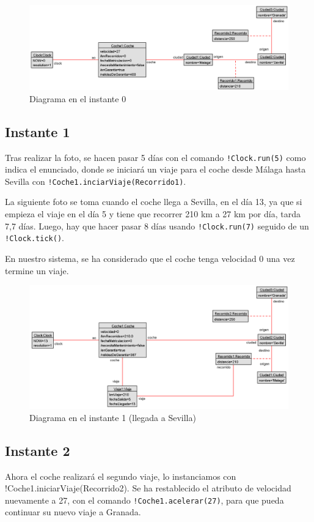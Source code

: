 \documentclass[12pt.a4paper]{article}
\begin{document}
\begin{figure}[H]
    \centering
    \includegraphics[width=\linewidth]{fotosInstantes/Instante0.png}
    \caption{Diagrama en el instante 0}
\end{figure}

\subsection{Instante 1}
Tras realizar la foto, se hacen pasar 5 días con el comando \texttt{!Clock.run(5)} como indica el enunciado, donde se iniciará un viaje para el coche desde Málaga hasta Sevilla con \texttt{!Coche1.inciarViaje(Recorrido1)}.

La siguiente foto se toma cuando el coche llega a Sevilla, en el día 13, ya que si empieza el viaje en el día 5 y tiene que recorrer 210 km a 27 km por día, tarda 7,7 días. Luego, hay que hacer pasar 8 días usando \texttt{!Clock.run(7)} seguido de un \texttt{!Clock.tick()}.

En nuestro sistema, se ha considerado que el coche tenga velocidad 0 una vez termine un viaje.

\begin{figure}[H]
    \centering
    \includegraphics[width=\linewidth]{fotosInstantes/Instante1.png}
    \caption{Diagrama en el instante 1 (llegada a Sevilla)}
\end{figure}

\subsection{Instante 2}
Ahora el coche realizará el segundo viaje, lo instanciamos con !Coche1.iniciarViaje(Recorrido2). Se ha restablecido el atributo de velocidad nuevamente a 27, con el comando \texttt{!Coche1.acelerar(27)}, para que pueda continuar su nuevo viaje a Granada.
\end{document}
